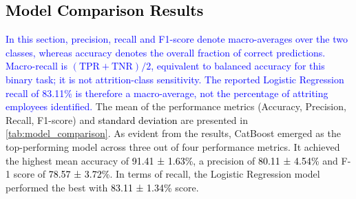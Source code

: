 \documentclass[a4paper,fleqn]{cas-sc}
\begin{document}
\subsection{\textcolor{black}{Model Comparison Results}}
\label{model-comparison}
\textcolor{blue}{In this section, precision, recall and F1-score denote macro-averages over the two classes, whereas accuracy denotes the overall fraction of correct predictions. Macro-recall is $(\mathrm{TPR}+\mathrm{TNR})/2$, equivalent to balanced accuracy for this binary task; it is not attrition-class sensitivity. The reported Logistic Regression recall of 83.11\% is therefore a macro-average, not the percentage of attriting employees identified.} The mean of the performance metrics (Accuracy, Precision, Recall, F1-score) and \textcolor{black}{standard deviation} are presented in \cref{tab:model_comparison}. As evident from the results, CatBoost emerged as the top-performing model across three out of four performance metrics. It achieved the highest mean accuracy of \textcolor{black}{91.41 ± 1.63\%}, a precision of \textcolor{black}{80.11 ± 4.54\%} and F-1 score of \textcolor{black}{78.57 ± 3.72\%}. In terms of recall, the Logistic Regression model performed the best with \textcolor{black}{83.11 ± 1.34\%} score.
\end{document}
